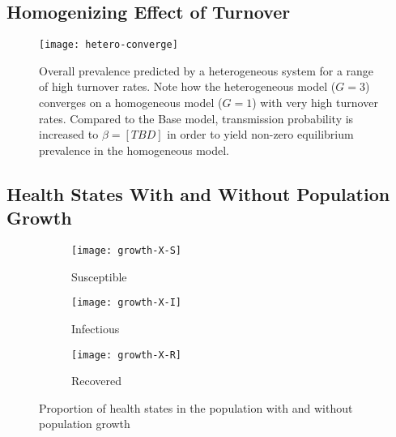 \subsection{Homogenizing Effect of Turnover}\label{aa:homogenize}
\begin{figure}[H]
  \centering
  \texttt{[image: hetero-converge]}
  \caption{Overall prevalence predicted by a heterogeneous system
    for a range of high turnover rates.
    Note how the heterogeneous model ($G = 3$) converges on a homogeneous model ($G = 1$)
    with very high turnover rates.
    Compared to the Base model,
    transmission probability is increased to $\beta = [TBD]$
    in order to yield non-zero equilibrium prevalence in the homogeneous model.}
  \label{fig:hetero-converge}
\end{figure}
\subsection{Health States With and Without Population Growth}
\begin{figure}[H]
  \centering
  \begin{subfigure}{0.31\linewidth}
    \centering
    \texttt{[image: growth-X-S]}
    \caption{Susceptible}
    \label{fig:growth-X-S}
  \end{subfigure}
  \begin{subfigure}{0.31\linewidth}
    \centering
    \texttt{[image: growth-X-I]}
    \caption{Infectious}
    \label{fig:growth-X-I}
  \end{subfigure}
  \begin{subfigure}{0.31\linewidth}
    \centering
    \texttt{[image: growth-X-R]}
    \caption{Recovered}
    \label{fig:growth-X-R}
  \end{subfigure}
  \caption{Proportion of health states in the population
    with and without population growth}
  \label{fig:growth-SIR}
\end{figure}
